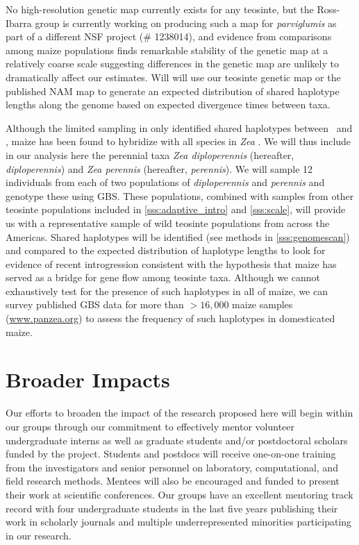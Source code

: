 No high-resolution genetic map currently exists for any teosinte, but the Ross-Ibarra group is currently working on producing such a map for \emph{parviglumis} as part of a different NSF project (\# 1238014), and evidence from comparisons among maize populations finds remarkable stability of the genetic map at a relatively coarse scale \citep{bauer2013} suggesting differences in the genetic map are unlikely to dramatically affect our estimates. 
Will will use our teosinte genetic map or the published NAM map \citep{McMullen2009} to generate an expected distribution of shared haplotype lengths along the genome based on expected divergence times between taxa.

Although the limited sampling in \citet{Ross-Ibarra2009a} only identified shared haplotypes between \zm\ and \zl, maize has been found to hybridize with all species in \emph{Zea} \citep{Wilkes1977}.
We will thus include in our analysis here the perennial taxa \emph{Zea diploperennis} (hereafter, \emph{diploperennis}) and \emph{Zea perennis} (hereafter, \emph{perennis}).  
We will sample 12 individuals from each of two populations of \emph{diploperennis} and \emph{perennis} and genotype these using GBS.
These populations, combined with samples from other teosinte populations included in \ref{sss:adaptive_intro} and \ref{sss:scale}, will provide us with a representative sample of wild teosinte populations from across the Americas.
Shared haplotypes will be identified (see methods in \ref{sss:genomescan}) and compared to the expected distribution of haplotype lengths to look for evidence of recent introgression consistent with the hypothesis that maize has served as a bridge for gene flow among teosinte taxa.
Although we cannot exhaustively test for the presence of such haplotypes in all of maize, we can survey published GBS data for more than $>16,000$ maize samples (\url{www.panzea.org}) to assess the frequency of such haplotypes in domesticated maize.

\section*{Broader Impacts}

Our efforts to broaden the impact of the research proposed here will begin within our groups through our commitment to effectively mentor volunteer undergraduate interns as well as graduate students and/or postdoctoral scholars funded by the project. Students and postdocs will receive one-on-one training from the investigators and senior personnel on laboratory, computational, and field research methods.  Mentees will also be encouraged and funded to present their work at scientific conferences.  Our groups have an excellent mentoring track record with four undergraduate students in the last five years publishing their work in scholarly journals and multiple underrepresented minorities participating in our research.

